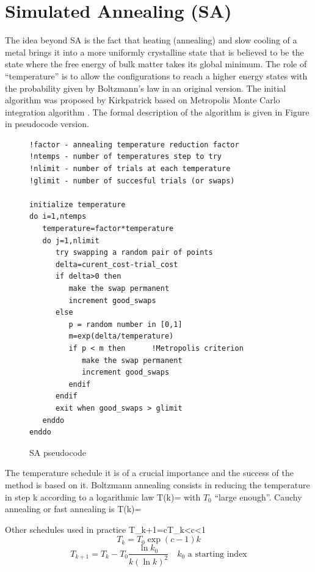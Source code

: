 \section{Simulated Annealing (SA)}
\par{The idea beyond SA is the fact that heating (annealing) and slow cooling of a
metal brings it into a more uniformly crystalline state that is believed to be
the state where the free energy of bulk matter takes its global minimum. The
role of ``temperature'' is to allow the configurations to reach a higher
energy states with the probability given by Boltzmann's law in an original
version. The initial algorithm was proposed by Kirkpatrick
\citep{Kirkpatrick83} based on Metropolis Monte Carlo integration algorithm
\citep{Metropolis53}. The formal description of the algorithm is given in Figure
 in pseudocode version.}
\begin{figure}[!htb]
\begin{verbatim}
!factor - annealing temperature reduction factor
!ntemps - number of temperatures step to try
!nlimit - number of trials at each temperature
!glimit - number of succesful trials (or swaps)

initialize temperature
do i=1,ntemps
   temperature=factor*temperature
   do j=1,nlimit
      try swapping a random pair of points
      delta=curent_cost-trial_cost
      if delta>0 then
         make the swap permanent
         increment good_swaps
      else
         p = random number in [0,1]
         m=exp(delta/temperature)
         if p < m then      !Metropolis criterion
            make the swap permanent
            increment good_swaps
         endif
      endif
      exit when good_swaps > glimit
   enddo
enddo
\end{verbatim}
\caption{SA pseudocode}
\label{SA}
\end{figure}
\par{The temperature schedule it is of a crucial importance and the success of the
method is based on it.
Boltzmann annealing consists in reducing the temperature in step k according
to a logarithmic law}
\be
T(k)=
\ee
with $T_0$ ``large enough''. Cauchy annealing or fast annealing is
\be
T(k)=
\ee
\par{Other schedules used in practice}
\be
\label{oscheldue}
T_{k+1}=cT_k<c<1
\ee
\begin{equation*}
T_k=T_0\exp{(c-1)k}
\end{equation*}
\begin{equation*}
T_{k+1}=T_k-T_0\frac{\ln k_0}{k(\ln k)^2} \quad k_0\text{ a starting index}
\end{equation*}
